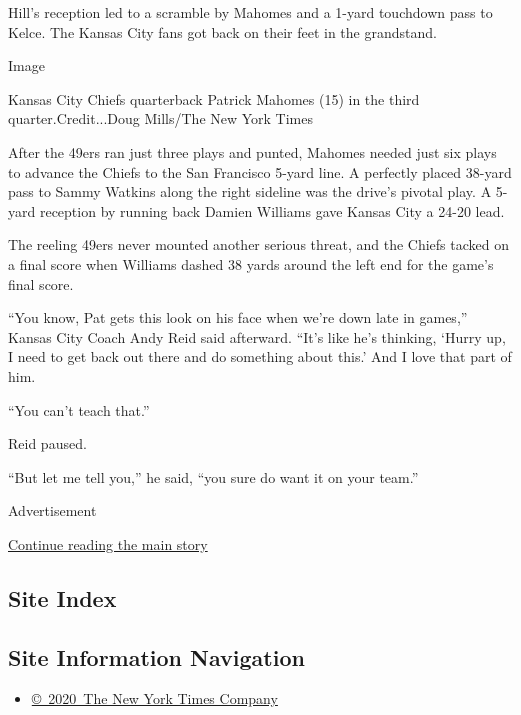 Hill's reception led to a scramble by Mahomes and a 1-yard touchdown
pass to Kelce. The Kansas City fans got back on their feet in the
grandstand.

Image

Kansas City Chiefs quarterback Patrick Mahomes (15) in the third
quarter.Credit...Doug Mills/The New York Times

After the 49ers ran just three plays and punted, Mahomes needed just six
plays to advance the Chiefs to the San Francisco 5-yard line. A
perfectly placed 38-yard pass to Sammy Watkins along the right sideline
was the drive's pivotal play. A 5-yard reception by running back Damien
Williams gave Kansas City a 24-20 lead.

The reeling 49ers never mounted another serious threat, and the Chiefs
tacked on a final score when Williams dashed 38 yards around the left
end for the game's final score.

``You know, Pat gets this look on his face when we're down late in
games,'' Kansas City Coach Andy Reid said afterward. ``It's like he's
thinking, `Hurry up, I need to get back out there and do something about
this.' And I love that part of him.

``You can't teach that.''

Reid paused.

``But let me tell you,'' he said, ``you sure do want it on your team.''

Advertisement

\protect\hyperlink{after-bottom}{Continue reading the main story}

\hypertarget{site-index}{%
\subsection{Site Index}\label{site-index}}

\hypertarget{site-information-navigation}{%
\subsection{Site Information
Navigation}\label{site-information-navigation}}

\begin{itemize}
\tightlist
\item
  \href{https://help.nytimes3xbfgragh.onion/hc/en-us/articles/115014792127-Copyright-notice}{©~2020~The
  New York Times Company}
\end{itemize}

